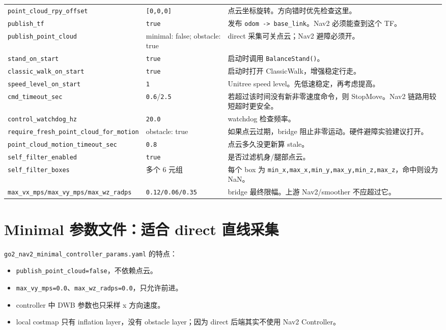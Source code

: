\documentclass[UTF8,11pt,a4paper,openany]{ctexrep}
\newcommand{\code}[1]{\nolinkurl{#1}}
\newcommand{\topic}[1]{\nolinkurl{#1}}
\newcommand{\param}[1]{\nolinkurl{#1}}
\newcommand{\file}[1]{\nolinkurl{#1}}
\begin{document}
\begin{footnotesize}
\begin{longtable}{L{0.36\textwidth}L{0.18\textwidth}L{0.36\textwidth}}
\param{point_cloud_rpy_offset} & \code{[0,0,0]} & 点云坐标旋转。方向错时优先检查这里。 \\
\param{publish_tf} & \code{true} & 发布 \topic{odom -> base_link}。Nav2 必须能查到这个 TF。 \\
\param{publish_point_cloud} & minimal: false; obstacle: true & direct 采集可关点云；Nav2 避障必须开。 \\
\param{stand_on_start} & \code{true} & 启动时调用 \code{BalanceStand()}。 \\
\param{classic_walk_on_start} & \code{true} & 启动时打开 ClassicWalk，增强稳定行走。 \\
\param{speed_level_on_start} & \code{1} & Unitree speed level。先低速稳定，再考虑提高。 \\
\param{cmd_timeout_sec} & \code{0.6}/\code{2.5} & 若超过该时间没有新非零速度命令，则 StopMove。Nav2 链路用较短超时更安全。 \\
\param{control_watchdog_hz} & \code{20.0} & watchdog 检查频率。 \\
\param{require_fresh_point_cloud_for_motion} & obstacle: true & 如果点云过期，bridge 阻止非零运动。硬件避障实验建议打开。 \\
\param{point_cloud_motion_timeout_sec} & \code{0.8} & 点云多久没更新算 stale。 \\
\param{self_filter_enabled} & \code{true} & 是否过滤机身/腿部点云。 \\
\param{self_filter_boxes} & 多个 6 元组 & 每个 box 为 \code{min_x,max_x,min_y,max_y,min_z,max_z}，命中则设为 NaN。 \\
\param{max_vx_mps/max_vy_mps/max_wz_radps} & \code{0.12/0.06/0.35} & bridge 最终限幅。上游 Nav2/smoother 不应超过它。 \\
\bottomrule
\end{longtable}
\end{footnotesize}

\section{Minimal 参数文件：适合 direct 直线采集}

\file{go2_nav2_minimal_controller_params.yaml} 的特点：

\begin{itemize}
  \item \param{publish_point_cloud=false}，不依赖点云。
  \item \param{max_vy_mps=0.0}、\param{max_wz_radps=0.0}，只允许前进。
  \item controller 中 DWB 参数也只采样 x 方向速度。
  \item local costmap 只有 inflation layer，没有 obstacle layer；因为 direct 后端其实不使用 Nav2 Controller。
\end{itemize}
\end{document}
